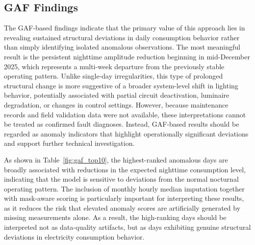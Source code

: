 \documentclass{article}
\begin{document}
\subsection{GAF Findings}


The GAF-based findings indicate that the primary value of this approach lies in revealing sustained structural deviations in daily consumption behavior rather than simply identifying isolated anomalous observations. The most meaningful result is the persistent nighttime amplitude reduction beginning in mid-December 2025, which represents a multi-week departure from the previously stable operating pattern. Unlike single-day irregularities, this type of prolonged structural change is more suggestive of a broader system-level shift in lighting behavior, potentially associated with partial circuit deactivation, luminaire degradation, or changes in control settings. However, because maintenance records and field validation data were not available, these interpretations cannot be treated as confirmed fault diagnoses. Instead, GAF-based results should be regarded as anomaly indicators that highlight operationally significant deviations and support further technical investigation.

As shown in Table~\ref{fig:gaf_top10}, the highest-ranked anomalous days are broadly associated with reductions in the expected nighttime consumption level, indicating that the model is sensitive to deviations from the normal nocturnal operating pattern. The inclusion of monthly hourly median imputation together with mask-aware scoring is particularly important for interpreting these results, as it reduces the risk that elevated anomaly scores are artificially generated by missing measurements alone. As a result, the high-ranking days should be interpreted not as data-quality artifacts, but as days exhibiting genuine structural deviations in electricity consumption behavior.
\end{document}
